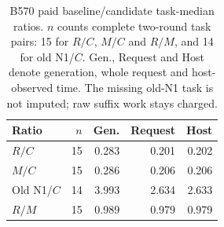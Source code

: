 \begin{table}[ht]\centering\small
\caption{B570 paid baseline/candidate task-median ratios. $n$ counts complete two-round task pairs: 15 for $R/C$, $M/C$ and $R/M$, and 14 for old N1/$C$. Gen., Request and Host denote generation, whole request and host-observed time. The missing old-N1 task is not imputed; raw suffix work stays charged.}\label{tab:b570_cost}
\setlength{\tabcolsep}{3pt}
\begin{tabular}{@{}lrrrr@{}}\toprule
Ratio & $n$ & Gen. & Request & Host\\\midrule
$R/C$ & 15 & 0.283 & 0.201 & 0.202\\
$M/C$ & 15 & 0.286 & 0.206 & 0.206\\
Old N1/$C$ & 14 & 3.993 & 2.634 & 2.633\\
$R/M$ & 15 & 0.989 & 0.979 & 0.979\\
\bottomrule\end{tabular}

\end{table}
